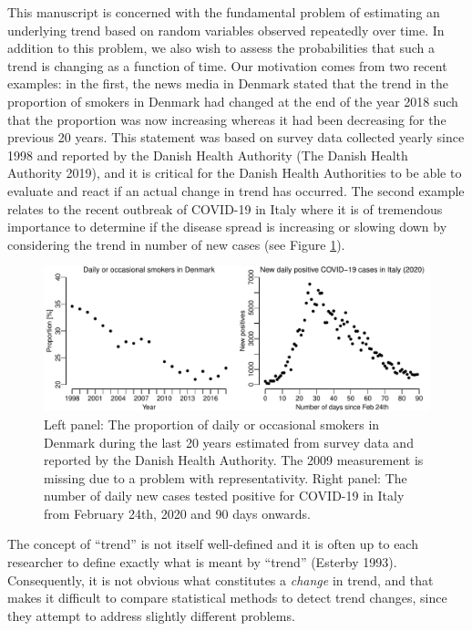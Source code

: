 \documentclass[
  11pt,
]{article}
\theoremstyle{nonumberplain}
\begin{document}
This manuscript is concerned with the fundamental problem of estimating
an underlying trend based on random variables observed repeatedly over
time. In addition to this problem, we also wish to assess the
probabilities that such a trend is changing as a function of time. Our
motivation comes from two recent examples: in the first, the news media
in Denmark stated that the trend in the proportion of smokers in Denmark
had changed at the end of the year 2018 such that the proportion was now
increasing whereas it had been decreasing for the previous 20 years.
This statement was based on survey data collected yearly since 1998 and
reported by the Danish Health Authority (The Danish Health Authority
2019), and it is critical for the Danish Health Authorities to be able
to evaluate and react if an actual change in trend has occurred. The
second example relates to the recent outbreak of COVID-19 in Italy where
it is of tremendous importance to determine if the disease spread is
increasing or slowing down by considering the trend in number of new
cases (see Figure \ref{fig:rawDataPlot}).

\begin{figure}[htb]
\center\includegraphics{rawDataPlotDouble}
\caption{Left panel: The proportion of daily or occasional smokers in Denmark during the last 20 years estimated from survey data and reported by the Danish Health Authority. The 2009 measurement is missing due to a problem with representativity. Right panel: The number of daily new cases tested positive for COVID-19 in Italy from February 24th, 2020 and 90 days onwards.}
\label{fig:rawDataPlot}
\end{figure}

The concept of ``trend'' is not itself well-defined and it is often up
to each researcher to define exactly what is meant by ``trend'' (Esterby
1993). Consequently, it is not obvious what constitutes a \emph{change}
in trend, and that makes it difficult to compare statistical methods to
detect trend changes, since they attempt to address slightly different
problems.
\end{document}
